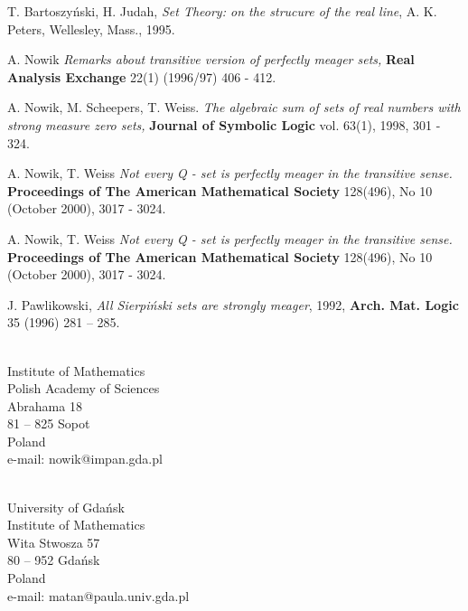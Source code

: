 \begin{thebibliography}{10}

 T. Bartoszy\'nski, H. Judah, {\it Set Theory: on the
strucure of the real line}, A. K. Peters, Wellesley, Mass., 1995.

A. Nowik
{\em Remarks about transitive version of perfectly
meager sets,}
{\bf Real Analysis Exchange} 22(1) (1996/97) 406 - 412.

A. Nowik, M. Scheepers, T. Weiss.
{\em The algebraic sum of sets of
    real numbers with strong measure zero sets,}
{\bf Journal of Symbolic Logic} vol. 63(1), 1998, 301 - 324.

A. Nowik, T. Weiss
{\em Not every Q - set is perfectly meager in the transitive sense.}
{\bf Proceedings of The American Mathematical Society} 128(496), No 10
(October 2000), 3017 - 3024.

A. Nowik, T. Weiss
{\em Not every Q - set is perfectly meager in the transitive sense.}
{\bf Proceedings of The American Mathematical Society} 128(496), No 10
(October 2000), 3017 - 3024.

J. Pawlikowski, {\em All Sierpi\'nski sets are strongly
meager}, 1992, {\bf Arch. Mat. Logic} 35 (1996) 281 -- 285.

\end{thebibliography}


\begin{center}
 \\
Institute of Mathematics \\
Polish Academy of Sciences \\
Abrahama 18 \\
81 -- 825 Sopot\\
Poland\\
e-mail: nowik@impan.gda.pl

 \\
University of Gda\'nsk \\
Institute of Mathematics \\
Wita Stwosza 57 \\
80 -- 952 Gda\'nsk \\
Poland\\
e-mail: matan@paula.univ.gda.pl
\end{center}

